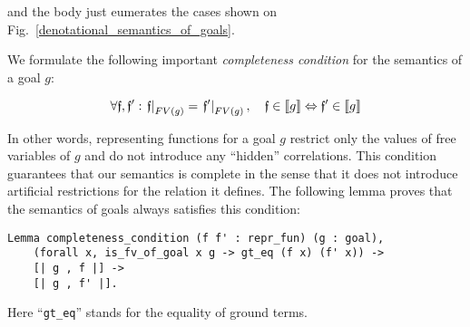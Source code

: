 and the body just eumerates the cases shown on Fig.~\ref{denotational_semantics_of_goals}.
  
We formulate the following important \emph{completeness condition} for the semantics of a goal $g$:

\[
\forall {\mathfrak f}, {\mathfrak f'}:  \left.{\mathfrak f}\right|_{FV(g)} = \left.{\mathfrak f'}\right|_{FV(g)}, \quad {\mathfrak f} \in \llbracket{g}\rrbracket \Leftrightarrow {\mathfrak f'} \in \llbracket{g}\rrbracket
\]

In other words, representing functions for a goal $g$ restrict only the values of free variables of $g$ and do not introduce any ``hidden'' correlations.
This condition guarantees that our semantics is complete in the sense that it does not introduce artificial restrictions for the relation it defines.
The following lemma proves that the semantics of goals always satisfies this condition:

\begin{lstlisting}[language=Coq,basicstyle=\footnotesize]
  Lemma completeness_condition (f f' : repr_fun) (g : goal),
    (forall x, is_fv_of_goal x g -> gt_eq (f x) (f' x)) ->
    [| g , f |] ->
    [| g , f' |].
\end{lstlisting}

Here ``\lstinline[language=Coq]{gt_eq}'' stands for the equality of ground terms.
